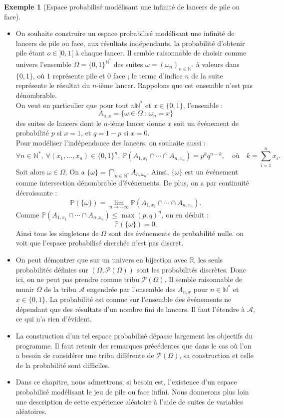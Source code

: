 \documentclass[french]{article}
\renewcommand{\P}{\mathbb{P}}
\newcommand{\N}{\mathbb{N}}
\newcommand{\R}{\mathbb{R}}
\newcommand{\st}{^*}
\theoremstyle{plain}
\theoremstyle{definition}
\newtheorem*{ex}{Exemple}
\theoremstyle{remark}
\begin{document}
\begin{ex}[Espace probabilisé modélisant une infinité de lancers de pile ou face]
	\begin{itemize}
		\item On souhaite construire un espace probabilisé modélisant une infinité de lancers de pile ou face, aux résultats indépendants, la probabilité d'obtenir pile étant $o\in]0,1[$ à chaque lancer. Il semble raisonnable de choisir comme univers l'ensemble $\Omega=\{0,1\}^{\N\st}$ des suites $\omega=(\omega_{n})_{n\in\N\st}$ à valeurs dans $\{0,1\}$, où $1$ représente pile et $0$ face ; le terme d'indice $n$ de la suite représente le résultat du $n$-ième lancer. Rappelons que cet ensemble n'est pas dénombrable.\\
		On veut en particulier que pour tout $n\N\st$ et $x\in\{0,1\}$, l'ensemble :
		$$A_{n,x}=\{\omega\in\Omega\ :\ \omega_n=x\}$$ des suites de lancers dont le $n$-ième lancer donne $x$ soit un événement de probabilité $p$ si $x=1$, et $q=1-p$ si $x=0$. \\
		Pour modéliser l'indépendance des lancers, on souhaite aussi :
		$$\forall n\in\N\st,\ \forall (x_1,\ldots,x_n)\in\{0,1\}^n,\ \P(A_{1,x_1}\cap\cdots\cap A_{n,x_n})=p^{k}q^{n-k},\quad\text{où}\quad k=\sum_{i=1}^{n}x_i.$$
		Soit alors $\omega\in\Omega$. On a $\{\omega\}=\displaystyle\bigcap_{n\in\N\st}A_{n,\omega_n}$. Ainsi, $\{\omega\}$ est un événement comme intersection dénombrable d'événements. De plus, on a par continuité décroissante :
		$$\P(\{\omega\})=\underset{n\to+\infty}{\lim}\P(A_{1,x_1}\cap\cdots\cap A_{n,x_n}).$$
		Comme $\P(A_{1,x_1}\cap\cdots\cap A_{n,x_n})\leqslant\max(p,q)^n$, on en déduit :
		$$\P(\{\omega\})=0.$$
		Ainsi tous les singletons de $\Omega$ sont des événements de probabilité nulle. on voit que l'espace probabilisé cherchée n'est pas discret.
		\item On peut démontrer que sur un univers en bijection avec $\R$, les seuls probabilités définies sur $(\Omega,\mathcal{P}(\Omega))$ sont les probabilités discrètes. Donc ici, on ne peut pas prendre comme tribu $\mathcal{P}(\Omega)$. Il semble raisonnable de munir $\Omega$ de la tribu $\mathcal{A}$ engendrée par l'ensemble des $A_{n,x}$ pour $n\in\N\st$ et $x\in\{0,1\}$. La probabilité est connue sur l'ensemble des événements ne dépendant que des résultats d'un nombre fini de lancers. Il faut l'étendre à $\mathcal{A}$, ce qui n'a rien d'évident.
		\item La construction d'un tel espace probabilisé dépasse largement les objectifs du programme. Il faut retenir des remarques précédentes que dans le cas où l'on a besoin de considérer une tribu différente de $\mathcal{P}(\Omega)$, sa construction et celle de la probabilité sont difficiles.
		\item Dans ce chapitre, nous admettrons, si besoin est, l'existence d'un espace probabilisé modélisant le jeu de pile ou face infini. Nous donnerons plus loin une description de cette expérience aléatoire à l'aide de suites de variables aléatoires.
	\end{itemize}
\end{ex}
\end{document}
